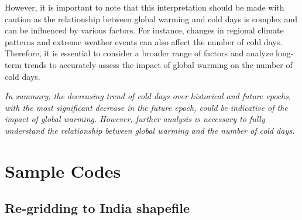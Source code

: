 \documentclass[a4paper, 12pt, twoside]{report}
\begin{document}
However, it is important to note that this interpretation should be made with caution as the relationship between global warming and cold days is complex and can be influenced by various factors. For instance, changes in regional climate patterns and extreme weather events can also affect the number of cold days. Therefore, it is essential to consider a broader range of factors and analyze long-term trends to accurately assess the impact of global warming on the number of cold days.

\textit{In summary, the decreasing trend of cold days over historical and future epochs, with the most significant decrease in the future epoch, could be indicative of the impact of global warming. However, further analysis is necessary to fully understand the relationship between global warming and the number of cold days.}













\newpage
\appendix


\chapter{Sample Codes}\label{app:appendix1}

\renewcommand\thefigure{\thechapter.\arabic{figure}}
\renewcommand{\theequation}{\thechapter.\arabic{equation}}
\setcounter{equation}{0}
\setcounter{figure}{0}

\section{Re-gridding to India shapefile}



\end{document}
